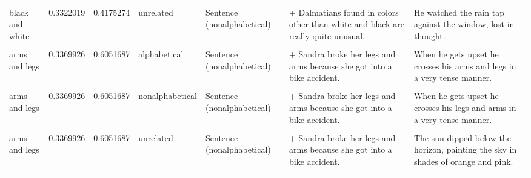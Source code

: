 \documentclass[
  12pt,
]{scrartcl}
\begin{document}
\begin{landscape}
\begin{longtable}{lrrllll}
\addlinespace
black and white & 0.3322019 & 0.4175274 & unrelated & Sentence (nonalphabetical) & + Dalmatians found in colors other than white and black are really quite unusual. & He watched the rain tap against the window, lost in thought.\\
\cellcolor{gray!6}{arms and legs} & \cellcolor{gray!6}{0.3369926} & \cellcolor{gray!6}{0.6051687} & \cellcolor{gray!6}{alphabetical} & \cellcolor{gray!6}{Sentence (alphabetical)} & \cellcolor{gray!6}{+ Sandra broke her arms and legs because she got into a bike accident.} & \cellcolor{gray!6}{When he gets upset he crosses his arms and legs in a very tense manner.}\\
arms and legs & 0.3369926 & 0.6051687 & alphabetical & Sentence (nonalphabetical) & + Sandra broke her legs and arms because she got into a bike accident. & When he gets upset he crosses his arms and legs in a very tense manner.\\
\cellcolor{gray!6}{arms and legs} & \cellcolor{gray!6}{0.3369926} & \cellcolor{gray!6}{0.6051687} & \cellcolor{gray!6}{nonalphabetical} & \cellcolor{gray!6}{Sentence (alphabetical)} & \cellcolor{gray!6}{+ Sandra broke her arms and legs because she got into a bike accident.} & \cellcolor{gray!6}{When he gets upset he crosses his legs and arms in a very tense manner.}\\
arms and legs & 0.3369926 & 0.6051687 & nonalphabetical & Sentence (nonalphabetical) & + Sandra broke her legs and arms because she got into a bike accident. & When he gets upset he crosses his legs and arms in a very tense manner.\\
\addlinespace
\cellcolor{gray!6}{arms and legs} & \cellcolor{gray!6}{0.3369926} & \cellcolor{gray!6}{0.6051687} & \cellcolor{gray!6}{unrelated} & \cellcolor{gray!6}{Sentence (alphabetical)} & \cellcolor{gray!6}{+ Sandra broke her arms and legs because she got into a bike accident.} & \cellcolor{gray!6}{The sun dipped below the horizon, painting the sky in shades of orange and pink.}\\
arms and legs & 0.3369926 & 0.6051687 & unrelated & Sentence (nonalphabetical) & + Sandra broke her legs and arms because she got into a bike accident. & The sun dipped below the horizon, painting the sky in shades of orange and pink.\\
\cellcolor{gray!6}{arts and crafts} & \cellcolor{gray!6}{0.4952497} & \cellcolor{gray!6}{0.6080374} & \cellcolor{gray!6}{alphabetical} & \cellcolor{gray!6}{Sentence (alphabetical)} & \cellcolor{gray!6}{+ Lilly enjoys doing arts and crafts to relax when she is stressed.} & \cellcolor{gray!6}{Arts and crafts are a wonderful way to express creativity through handmade projects.}\\

\end{longtable}
\end{landscape}
\end{document}
